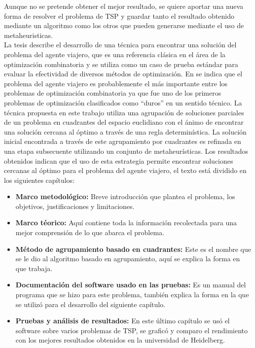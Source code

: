 \hspace*{1cm} Aunque no se pretende obtener el mejor resultado, se quiere aportar una nueva forma de resolver el problema de TSP y guardar tanto el resultado obtenido mediante un algoritmo como los otros que pueden generarse mediante el uso de metaheuristicas.\\
\hspace*{1cm} La tesis describe el desarrollo de una técnica para encontrar una solución del problema del agente viajero, que es una referencia clásica en el área de la optimización combinatoria y se utiliza como un caso de prueba estándar para evaluar la efectividad de diversos métodos de optimización. En \cite{[REF1]} se indica que el problema del agente viajero es probablemente el más importante entre los problemas de optimización combinatoria ya que fue uno de los primeros problemas de optimización clasificados como “duros” en un sentido técnico. La técnica propuesta en este trabajo utiliza una agrupación de soluciones parciales de un problema en cuadrantes del espacio euclidiano con el ánimo de encontrar una solución cercana al óptimo a través de una regla determinística. La solución inicial encontrada a través de este agrupamiento por cuadrantes es refinada en una etapa subsecuente utilizando un conjunto de metaheurísticas. Los resultados obtenidos indican que el uso de esta estrategia permite encontrar soluciones cercanas al óptimo para el problema del agente viajero, el texto está dividido en los siguientes capítulos:
\begin{itemize}
	\item \textbf{Marco metodológico: } Breve introducción que plantea el problema, los objetivos, justificaciones y limitaciones.
	\item \textbf{Marco téorico: } Aquí contiene toda la información recolectada para una mejor comprensión de lo que abarca el problema.
	\item \textbf{Método de agrupamiento basado en cuadrantes: } Este es el nombre que se le dio al algoritmo basado en agrupamiento, aquí se explica la forma en que trabaja.
	\item \textbf{Documentación del software usado en las pruebas: } Es un manual del programa que se hizo para este problema, también explica la forma en la que se utilizó para el desarrollo del siguiente capítulo.
	\item \textbf{Pruebas y análisis de resultados: } En este último capítulo se usó el software sobre varios problemas de TSP, se graficó y comparo el rendimiento con los mejores resultados obtenidos en la universidad de Heidelberg.
\end{itemize}
\newpage
